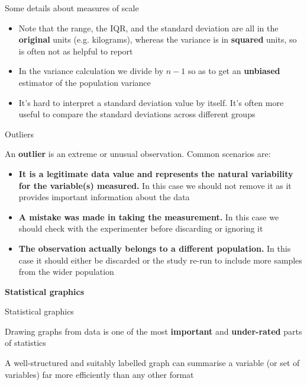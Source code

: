 \documentclass[12pt,xcolor=dvipsnames,handout,mathserif,aspectratio=169]{beamer}
\newcommand{\bbl}[1]{{\color{NavyBlue} \textbf{#1}}}
\newcommand{\bre}[1]{{\color{red} \textbf{#1}}}
\newcommand{\bgr}[1]{{\color{PineGreen} \textbf{#1}}}
\begin{document}
\begin{frame}{Some details about measures of scale}
\begin{itemize}
\item Note that the range, the IQR, and the standard deviation are all in the \bbl{original} units (e.g. kilograms), whereas the variance is in \bre{squared} units, so is often not as helpful to report
\pause
\item In the variance calculation we divide by $n-1$ so as to get an \bgr{unbiased} estimator of the population variance
\item It's hard to interpret a standard deviation value by itself. It's often more useful to compare the standard deviations across different groups
\end{itemize}
\end{frame}

\begin{frame}{Outliers }

An \bre{outlier} is an extreme or unusual observation. Common scenarios are:
\begin{itemize}
\item \bgr{It is a legitimate data value and represents the natural variability for the variable(s) measured.} In this case we should not remove it as it provides important information about the data
\pause
\item \bbl{A mistake was made in taking the measurement.} In this case we should check with the experimenter before discarding or ignoring it
\pause
\item \bre{The observation actually belongs to a different population.} In this case it should either be discarded or the study re-run to include more samples from the wider population
\end{itemize}
\end{frame}

\begin{frame}[fragile]{}
\bbl{\Huge Statistical graphics}\\ 
\vspace{0.5cm}
\end{frame}

\begin{frame}{ Statistical graphics  }

\begin{block}{}
Drawing graphs from data is one of the most \bbl{important} and \bre{under-rated} parts of statistics
\end{block}
\pause
\vspace{0.2cm}
A well-structured and suitably labelled graph can summarise a variable (or set of variables) far more efficiently than any other format\\

\end{frame}
\end{document}
